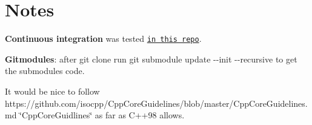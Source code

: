 \section*{Notes}


\begin{DoxyItemize}
\item {\bfseries Continuous integration} was tested \href{https://github.com/MRKonrad/ContinousIntegrationPlayground}{\tt in this repo}.
\item {\bfseries Gitmodules}\-: after {\ttfamily git clone} run {\ttfamily git submodule update -\/-\/init -\/-\/recursive} to get the submodules code.
\item It would be nice to follow https\-://github.com/isocpp/\-Cpp\-Core\-Guidelines/blob/master/\-Cpp\-Core\-Guidelines.\-md \char`\"{}\-Cpp\-Core\-Guidlines\char`\"{} as far as C++98 allows. 
\end{DoxyItemize}